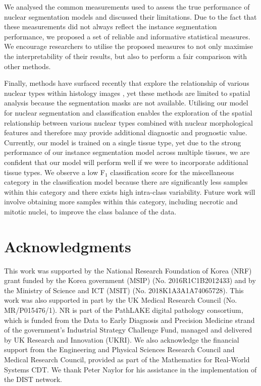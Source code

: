 \documentclass[journal]{IEEEtran}
\begin{document}
	We analysed the common measurements used to assess the true performance of nuclear segmentation models and discussed their limitations. Due to the fact that these measurements did not always reflect the instance segmentation performance, we proposed a set of reliable and informative statistical measures. We encourage researchers to utilise the proposed measures to not only maximise the interpretability of their results, but also to perform a fair comparison with other methods.
	
	Finally, methods have surfaced recently that explore the relationship of various nuclear types within histology images \cite{javed2018cellular, sirinukunwattana2018novel}, yet these methods are limited to spatial analysis because the segmentation masks are not available. Utilising our model for nuclear segmentation and classification enables the exploration of the spatial relationship between various nuclear types combined with nuclear morphological features and therefore may provide additional diagnostic and prognostic value. Currently, our model is trained on a single tissue type, yet due to the strong performance of our instance segmentation model across multiple tissues, we are confident that our model will perform well if we were to incorporate additional tissue types. We observe a low F$_1$ classification score for the miscellaneous category in the classification model because there are significantly less samples within this category and there exists high intra-class variability. Future work will involve obtaining more samples within this category, including necrotic and mitotic nuclei, to improve the class balance of the data. 
	 
	 	 
\section*{Acknowledgments}
	
	\setcounter{table}{0}
    \renewcommand{\thetable}{A\arabic{table}}
	
	This work was supported by the National Research Foundation of Korea (NRF) grant funded by the Korea government (MSIP) (No. 2016R1C1B2012433) and by the Ministry of Science and ICT (MSIT) (No. 2018K1A3A1A74065728). This work was also supported in part by the UK Medical Research Council (No. MR/P015476/1). NR is part of the PathLAKE digital pathology consortium, which is funded from the Data to Early Diagnosis and Precision Medicine strand of the government’s Industrial Strategy Challenge Fund, managed and delivered by UK Research and Innovation (UKRI). We also acknowledge the financial support from the Engineering and Physical Sciences Research Council and Medical Research Council, provided as part of the Mathematics for Real-World Systems CDT. We thank Peter Naylor for his assistance in the implementation of the DIST network.
	
\end{document}
